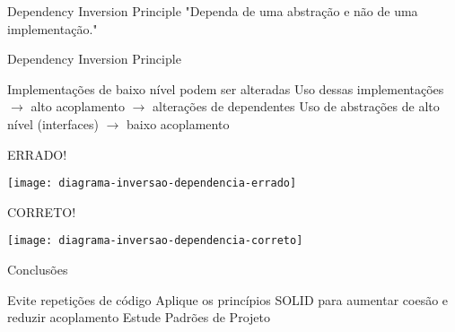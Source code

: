 \documentclass{beamer}
\begin{document}
\begin{frame}{Dependency Inversion Principle}
 "Dependa de uma abstração e não de uma implementação."
\end{frame}

\begin{frame}{Dependency Inversion Principle}
 \begin{outline}
   Implementações de baixo nível podem ser alteradas
   Uso dessas implementações $\rightarrow$ alto acoplamento $\rightarrow$ alterações de dependentes
   Uso de abstrações de alto nível (interfaces) $\rightarrow$ baixo acoplamento
 \end{outline}
\end{frame}

\begin{frame}{ERRADO!}
  \begin{center}
    \texttt{[image: diagrama-inversao-dependencia-errado]}
  \end{center}
\end{frame}

\begin{frame}{CORRETO!}
  \begin{center}
    \texttt{[image: diagrama-inversao-dependencia-correto]}
  \end{center}
\end{frame}

\begin{frame}{Conclusões}
  \begin{outline}
     Evite \alert{repetições} de código
     Aplique os princípios SOLID para \alert{aumentar coesão} e \alert{reduzir acoplamento}
     Estude \alert{Padrões de Projeto}
  \end{outline}
\end{frame}
\end{document}
